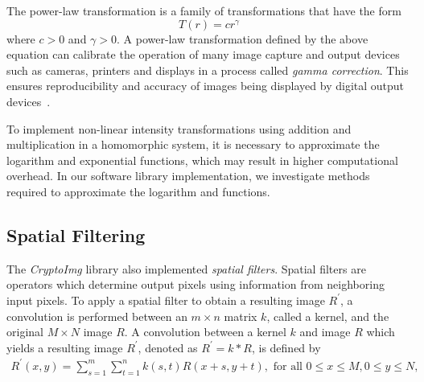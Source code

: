 The power-law transformation is a family of transformations that have the form
\begin{equation}
    T\left(r\right) = c r^{\gamma}
\end{equation}
where $c>0$ and $\gamma > 0$.
A power-law transformation defined by the above equation can calibrate the operation of many image capture and output devices such as cameras, printers and displays in a process called \textit{gamma correction}. This ensures reproducibility and accuracy of images being displayed by digital output devices~\cite{gonzalez_digital_2008}.

To implement non-linear intensity transformations using addition and multiplication in a homomorphic system, it is necessary to approximate the logarithm and exponential functions, which may result in higher computational overhead. In our software library implementation, we investigate methods required to approximate the logarithm and functions.

\subsection{Spatial Filtering}
The \textit{CryptoImg} library also implemented \textit{spatial filters}. Spatial filters are operators which determine output pixels using information from neighboring input pixels. To apply a spatial filter to obtain a resulting image $R^\prime$, a convolution is performed between an $m \times n$ matrix $k$, called a kernel, and the original $M\times N$ image $R$.
A convolution between a kernel $k$ and image $R$ which yields a resulting image $R^\prime$, denoted as $R^\prime = k \ast R$, is defined by
\begin{align} \label{eq:spatialfilter}
	R^\prime(x,y) = \sum_{s=1}^m{\sum_{t=1}^n{k(s,t)R(x+s,y+t)}}, \text{ for all } 0\leq x \leq M, 0 \leq y \leq N,
\end{align}

